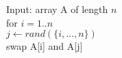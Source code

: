 \documentclass[varwidth]{standalone}
\begin{document}
Input: array A of length $n$ \\

for $i = 1..n$ \\
	$j \leftarrow rand(\{i, \ldots, n\})$ \\
	swap A[i] and A[j]
\end{document}
